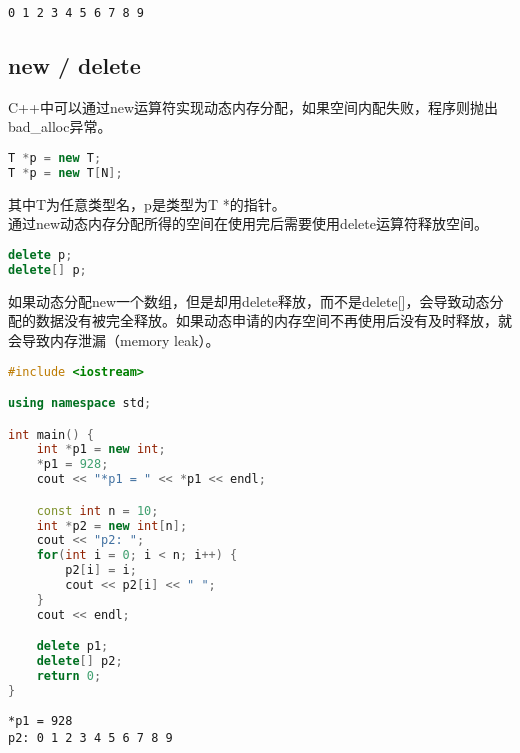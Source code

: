 \begin{tcolorbox}
	\begin{verbatim}
0 1 2 3 4 5 6 7 8 9
	\end{verbatim}
\end{tcolorbox}

\vspace{0.5cm}

\subsection{new / delete}

C++中可以通过new运算符实现动态内存分配，如果空间内配失败，程序则抛出bad\_alloc异常。

\vspace{-0.5cm}

\begin{lstlisting}[language=C++]
T *p = new T;
T *p = new T[N];
\end{lstlisting}

其中T为任意类型名，p是类型为T *的指针。\\

通过new动态内存分配所得的空间在使用完后需要使用delete运算符释放空间。

\vspace{-0.5cm}

\begin{lstlisting}[language=C++]
delete p;
delete[] p;
\end{lstlisting}

如果动态分配new一个数组，但是却用delete释放，而不是delete[]，会导致动态分配的数据没有被完全释放。如果动态申请的内存空间不再使用后没有及时释放，就会导致内存泄漏（memory leak）。\\


\begin{lstlisting}[language=C++]
#include <iostream>

using namespace std;

int main() {
    int *p1 = new int;
    *p1 = 928;
    cout << "*p1 = " << *p1 << endl;

    const int n = 10;
    int *p2 = new int[n];
    cout << "p2: ";
    for(int i = 0; i < n; i++) {
        p2[i] = i;
        cout << p2[i] << " ";
    }
    cout << endl;

    delete p1;
    delete[] p2;
    return 0;
}
\end{lstlisting}

\begin{tcolorbox}
	\begin{verbatim}
*p1 = 928
p2: 0 1 2 3 4 5 6 7 8 9
	\end{verbatim}
\end{tcolorbox}

